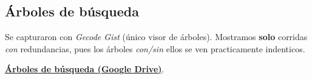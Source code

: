 
\FloatBarrier

\subsection{Árboles de búsqueda}\label{sec:01-sudoku-arboles}
Se capturaron con \textit{Gecode Gist} (único visor de árboles). Mostramos \textbf{solo} corridas \emph{con} redundancias, pues los árboles \emph{con/sin} ellos se ven practicamente indenticos.

\href{https://drive.google.com/drive/folders/125bijiUVxOe8lKL5cBToh5QjyLDW0jIM?usp=sharing}{\textbf{Árboles de búsqueda (Google Drive)}}.